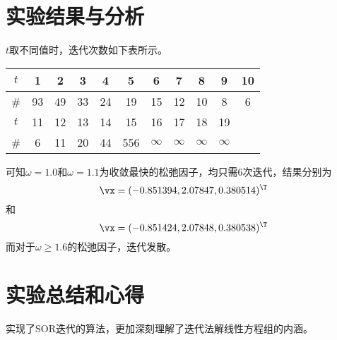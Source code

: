 \documentclass[reportComp]{thesis}
\begin{document}
\section{实验结果与分析}
$t$取不同值时，迭代次数如下表所示。
\begin{center}
\begin{tabular}{ccccccccccc}\hline\hline
$t$ & 1 & 2 & 3 & 4 & 5 & 6 & 7 & 8 & 9 & 10\\\hline
\# & 93 & 49 & 33 & 24 & 19 & 15 & 12 & 10 & 8 & 6\\\hline\hline
$t$ & 11 & 12 & 13 & 14 & 15 & 16 & 17 & 18 & 19 & \\\hline
\# & 6 & 11 & 20 & 44 & 556 & $\infty$ & $\infty$ & $\infty$ & $\infty$ & \\\hline\hline
\end{tabular}
\end{center}

可知$\omega=1.0$和$\omega=1.1$为收敛最快的松弛因子，均只需6次迭代，结果分别为
\[\vx=(-0.851394,2.07847,0.380514)^\T\]
和
\[\vx=(-0.851424,2.07848,0.380538)^\T\]
而对于$\omega\geq 1.6$的松弛因子，迭代发散。

\section{实验总结和心得}
实现了SOR迭代的算法，更加深刻理解了迭代法解线性方程组的内涵。
\end{document}
